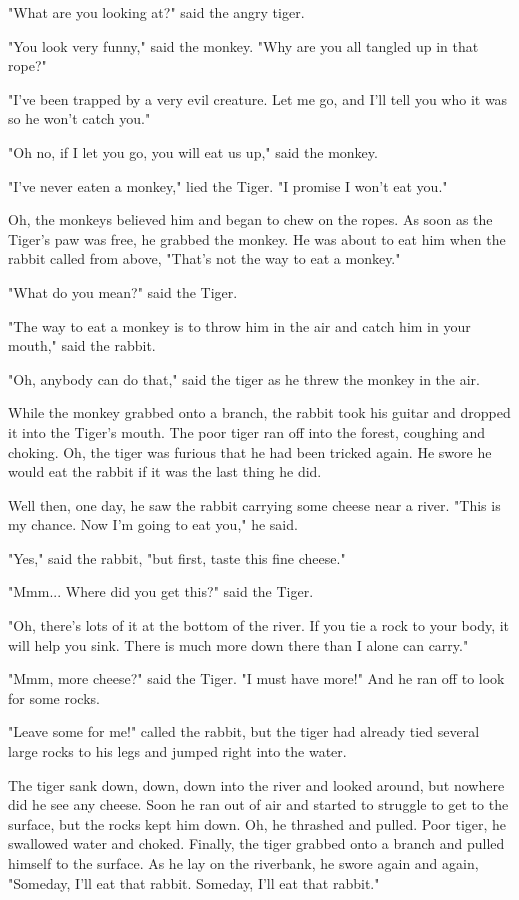 "What are you looking at?" said the angry tiger.

"You look very funny," said the monkey. "Why are you all tangled up in that rope?"

"I've been trapped by a very evil creature. Let me go, and I'll tell you who it was so he won't catch you."

"Oh no, if I let you go, you will eat us up," said the monkey.

"I've never eaten a monkey," lied the Tiger. "I promise I won't eat you."

Oh, the monkeys believed him and began to chew on the ropes. As soon as the Tiger's paw was free, he grabbed the monkey. He was about to eat him when the rabbit called from above, "That's not the way to eat a monkey."

"What do you mean?" said the Tiger.

"The way to eat a monkey is to throw him in the air and catch him in your mouth," said the rabbit.

"Oh, anybody can do that," said the tiger as he threw the monkey in the air.

While the monkey grabbed onto a branch, the rabbit took his guitar and dropped it into the Tiger's mouth. The poor tiger ran off into the forest, coughing and choking. Oh, the tiger was furious that he had been tricked again. He swore he would eat the rabbit if it was the last thing he did.

Well then, one day, he saw the rabbit carrying some cheese near a river. "This is my chance. Now I'm going to eat you," he said.

"Yes," said the rabbit, "but first, taste this fine cheese."

"Mmm... Where did you get this?" said the Tiger.

"Oh, there's lots of it at the bottom of the river. If you tie a rock to your body, it will help you sink. There is much more down there than I alone can carry."

"Mmm, more cheese?" said the Tiger. "I must have more!" And he ran off to look for some rocks.

"Leave some for me!" called the rabbit, but the tiger had already tied several large rocks to his legs and jumped right into the water.

The tiger sank down, down, down into the river and looked around, but nowhere did he see any cheese. Soon he ran out of air and started to struggle to get to the surface, but the rocks kept him down. Oh, he thrashed and pulled. Poor tiger, he swallowed water and choked. Finally, the tiger grabbed onto a branch and pulled himself to the surface. As he lay on the riverbank, he swore again and again, "Someday, I'll eat that rabbit. Someday, I'll eat that rabbit."

